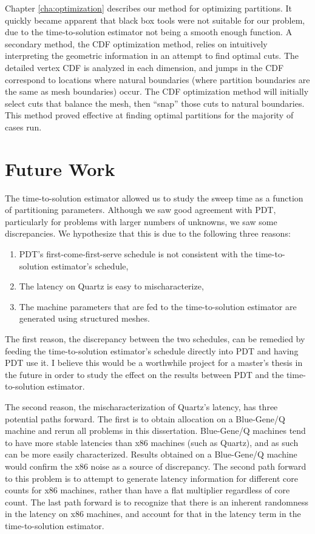 Chapter \ref{cha:optimization} describes our method for optimizing partitions.
It quickly became apparent that black box tools were not suitable for our problem, due to the time-to-solution estimator not being a smooth enough function.
A secondary method, the CDF optimization method, relies on intuitively interpreting the geometric information in an attempt to find optimal cuts.
The detailed vertex CDF is analyzed in each dimension, and jumps in the CDF correspond to locations where natural boundaries (where partition boundaries are the same as mesh boundaries) occur.
The CDF optimization method will initially select cuts that balance the mesh, then ``snap'' those cuts to natural boundaries.
This method proved effective at finding optimal partitions for the majority of cases run.

\section{Future Work}

The time-to-solution estimator allowed us to study the sweep time as a function of partitioning parameters.
Although we saw good agreement with PDT, particularly for problems with larger numbers of unknowns, we saw some discrepancies.
We hypothesize that this is due to the following three reasons:
\begin{enumerate}
\item PDT's first-come-first-serve schedule is not consistent with the time-to-solution estimator's schedule,
\item The latency on Quartz is easy to mischaracterize,
\item The machine parameters that are fed to the time-to-solution estimator are generated using structured meshes.
\end{enumerate}

The first reason, the discrepancy between the two schedules, can be remedied by feeding the time-to-solution estimator's schedule directly into PDT and having PDT use it.
I believe this would be a worthwhile project for a master's thesis in the future in order to study the effect on the results between PDT and the time-to-solution estimator.

The second reason, the mischaracterization of Quartz's latency, has three potential paths forward.
The first is to obtain allocation on a Blue-Gene/Q machine and rerun all problems in this dissertation.
Blue-Gene/Q machines tend to have more stable latencies than x86 machines (such as Quartz), and as such can be more easily characterized.
Results obtained on a Blue-Gene/Q machine would confirm the x86 noise as a source of discrepancy.
The second path forward to this problem is to attempt to generate latency information for different core counts for x86 machines, rather than have a flat multiplier regardless of core count.
The last path forward is to recognize that there is an inherent randomness in the latency on x86 machines, and account for that in the latency term in the time-to-solution estimator.

